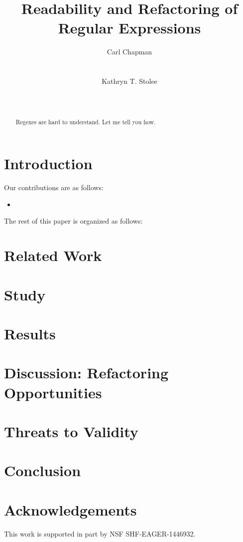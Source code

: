 \documentclass{sig-alternate-05-2015}
\begin{document}
%
\title{Readability and Refactoring of Regular Expressions}


\author{
\alignauthor
Carl Chapman\\
       \\
       \\
\alignauthor
Kathryn T. Stolee\\
       \\
       \\
\alignauthor
}


\maketitle


\begin{abstract}
Regexes are hard to understand. Let me tell you how. 
\end{abstract}


\section{Introduction}

Our contributions are as follows: 
\begin{itemize}
\item 
\end{itemize}

The rest of this paper is organized as follows: 


\section{Related Work}


\section{Study}

\section{Results}

\section{Discussion: Refactoring Opportunities}

\section{Threats to Validity} 


\section{Conclusion}


\balance

\section*{Acknowledgements}
This work is supported in part by  NSF SHF-EAGER-1446932. 




\end{document}
